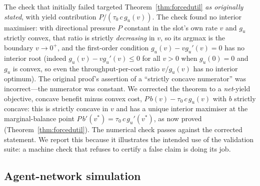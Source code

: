 \documentclass[11pt,twocolumn,a4paper]{article}
\theoremstyle{plain}
\theoremstyle{definition}
\theoremstyle{remark}
\newcommand{\tick}{\tau_0}
\newcommand{\pres}{P}
\begin{document}
The check that initially failed targeted Theorem~\ref{thm:forcedutil}
\emph{as originally stated}, with yield contribution
$\pres/(\tick\,c\,g_u(v))$.
The check found no interior maximiser: with directional pressure
$\pres$ constant in the slot's own rate $v$ and $g_u$ strictly convex,
that ratio is strictly \emph{decreasing} in $v$, so its argmax is the
boundary $v\to 0^+$, and the first-order condition
$g_u(v)-v g_u'(v)=0$ has no interior root (indeed
$g_u(v)-v g_u'(v)\le 0$ for all $v>0$ when $g_u(0)=0$ and $g_u$ is
convex, so even the throughput-per-cost ratio $v/g_u(v)$ has no interior
optimum). The original proof's assertion of a ``strictly concave
numerator'' was incorrect---the numerator was constant. We corrected the
theorem to a \emph{net}-yield objective, concave benefit minus convex
cost, $\pres\,b(v)-\tick\,c\,g_u(v)$ with $b$ strictly concave: this is
strictly concave in $v$ and has a unique interior maximiser at the
marginal-balance point $\pres\,b'(v^*)=\tick\,c\,g_u'(v^*)$, as now
proved (Theorem~\ref{thm:forcedutil}). The numerical check passes
against the corrected statement. We report this because it illustrates
the intended use of the validation suite: a machine check that refuses
to certify a false claim is doing its job.

\subsection{Agent-network simulation}
\end{document}
